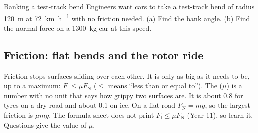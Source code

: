 \begin{workedexample}{Banking a test-track bend}\label{ch2:we:bankroad}
Engineers want cars to take a test-track bend of radius \qty{120}{m} at \qty{72}{km.h^{-1}}
with no friction needed. (a) Find the bank angle. (b) Find the normal force on a
\qty{1300}{kg} car at this speed.
\end{workedexample}

\subsection*{Friction: flat bends and the rotor ride}

\begin{refresher}{Friction}
 stops surfaces sliding over each other. It is only as big as it needs
to be, up to a maximum: $F_\mathrm{f} \le \mu F_\mathrm{N}$ ($\le$ means ``less than or equal
to''). The  ($\mu$) is a number with no unit that says how
grippy two surfaces are. It is about 0.8 for tyres on a dry road and about 0.1 on ice. On a
flat road $F_\mathrm{N} = mg$, so the largest friction is $\mu mg$. The formula sheet does not
print $F_\mathrm{f} \le \mu F_\mathrm{N}$ (Year 11), so learn it. Questions give the value of
$\mu$.
\end{refresher}

